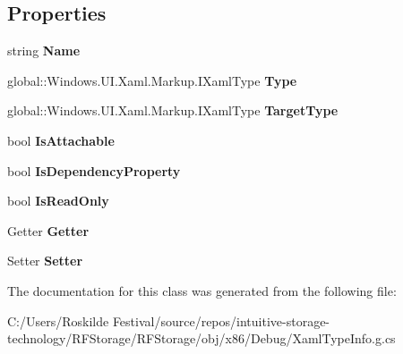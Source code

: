 \subsection*{Properties}
\begin{DoxyCompactItemize}
\item 
\mbox{\label{class_r_f_storage_1_1_r_f_storage___xaml_type_info_1_1_xaml_member_a84624a22f7d7efa8516579139afee433}} 
string {\bfseries Name}\hspace{0.3cm}{\ttfamily  [get]}
\item 
\mbox{\label{class_r_f_storage_1_1_r_f_storage___xaml_type_info_1_1_xaml_member_a054f75e68c5f78332047e4ece19d6cde}} 
global\+::\+Windows.\+U\+I.\+Xaml.\+Markup.\+I\+Xaml\+Type {\bfseries Type}\hspace{0.3cm}{\ttfamily  [get]}
\item 
\mbox{\label{class_r_f_storage_1_1_r_f_storage___xaml_type_info_1_1_xaml_member_a8d2fedbaf28a6315825facdb9d7e92b0}} 
global\+::\+Windows.\+U\+I.\+Xaml.\+Markup.\+I\+Xaml\+Type {\bfseries Target\+Type}\hspace{0.3cm}{\ttfamily  [get]}
\item 
\mbox{\label{class_r_f_storage_1_1_r_f_storage___xaml_type_info_1_1_xaml_member_aa878a514f5328b90978194c05aa314f6}} 
bool {\bfseries Is\+Attachable}\hspace{0.3cm}{\ttfamily  [get]}
\item 
\mbox{\label{class_r_f_storage_1_1_r_f_storage___xaml_type_info_1_1_xaml_member_a451e5b4c98d2dd91349929855dec82de}} 
bool {\bfseries Is\+Dependency\+Property}\hspace{0.3cm}{\ttfamily  [get]}
\item 
\mbox{\label{class_r_f_storage_1_1_r_f_storage___xaml_type_info_1_1_xaml_member_a8c22cc4e8b18bc2f12f6f8d8b096dd89}} 
bool {\bfseries Is\+Read\+Only}\hspace{0.3cm}{\ttfamily  [get]}
\item 
\mbox{\label{class_r_f_storage_1_1_r_f_storage___xaml_type_info_1_1_xaml_member_ab5b8e6fa84ebf7db23c6eef8f7e24922}} 
Getter {\bfseries Getter}\hspace{0.3cm}{\ttfamily  [get, set]}
\item 
\mbox{\label{class_r_f_storage_1_1_r_f_storage___xaml_type_info_1_1_xaml_member_a7cda4b109c95f7ed406ad29b1aabe936}} 
Setter {\bfseries Setter}\hspace{0.3cm}{\ttfamily  [get, set]}
\end{DoxyCompactItemize}


The documentation for this class was generated from the following file\+:\begin{DoxyCompactItemize}
\item 
C\+:/\+Users/\+Roskilde Festival/source/repos/intuitive-\/storage-\/technology/\+R\+F\+Storage/\+R\+F\+Storage/obj/x86/\+Debug/Xaml\+Type\+Info.\+g.\+cs\end{DoxyCompactItemize}
